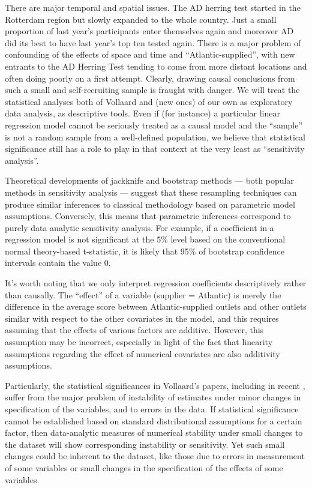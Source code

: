 \documentclass[alpha-refs]{wiley-article}
\begin{document}
There are major temporal and spatial issues. 
The AD herring test started in the Rotterdam region but slowly expanded to the whole country.  Just a small proportion of last year's participants enter themselves again and moreover AD did its best to have last year's top ten tested again. There is a major problem of confounding of the effects of space and time and ``Atlantic-supplied'', with new entrants to the AD Herring Test tending to come from more distant locations and often doing poorly on a first attempt.  Clearly, drawing causal conclusions from such a small and self-recruiting sample is fraught with danger. We will treat the statistical analyses both of Vollaard and (new ones) of our own as exploratory data analysis, as descriptive tools.  Even if (for instance) a particular linear regression model cannot be seriously treated as a causal model and the ``sample'' is not a random sample from a well-defined population, we believe that statistical significance still has a role to play in that context at the very least as ``sensitivity analysis''.

Theoretical developments of jackknife and bootstrap methods --- both popular methods in sensitivity analysis --- suggest that these resampling techniques can produce similar inferences to classical methodology based on parametric model assumptions. Conversely, this means that parametric inferences correspond to purely data analytic sensitivity analysis. For example, if a coefficient in a regression model is not significant at the 5\% level based on the conventional normal theory-based t-statistic, it is likely that 95\% of bootstrap confidence intervals contain the value 0.

It's worth noting that we only interpret regression coefficients descriptively rather than causally. The ``effect'' of a variable (supplier = Atlantic) is merely the difference in the average score between Atlantic-supplied outlets and other outlets similar with respect to the other covariates in the model, and this requires assuming that the effects of various factors are additive. However, this assumption may be incorrect, especially in light of the fact that linearity assumptions regarding the effect of numerical covariates are also additivity assumptions.

Particularly, the statistical significances in Vollaard's papers, including in recent \citet{vollaard2021bias}, suffer from the major problem of instability of estimates under minor changes in specification of the variables, and to errors in the data.
If statistical significance cannot be established based on standard distributional assumptions for a certain factor, then data-analytic measures of numerical stability under small changes to the dataset will show corresponding instability or sensitivity. Yet such small changes could be inherent to the dataset, like those due to errors in measurement of some variables or small changes in the specification of the effects of some variables.
\end{document}
